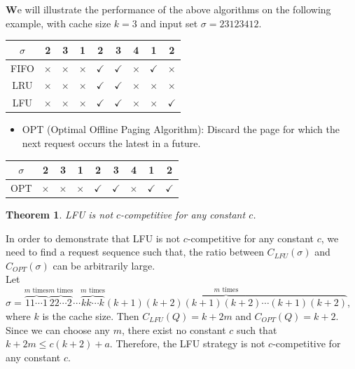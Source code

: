 \documentclass{article}
\newtheorem{theorem}{Theorem}
\newenvironment{proof}[1][Proof]{\begin{trivlist}
\item[\hskip \labelsep {\bfseries #1}]}{\end{trivlist}}
\begin{document}
\textbf We will illustrate the performance of the above algorithms on the following example, 
with cache size $k = 3$ and input set $\sigma = 23123412$.
\begin{center}
 \begin{tabular} {|c|c|c|c|c|c|c|c|c|}
\hline
$\sigma$ & 2  & 3 & 1 & 2 & 3 & 4 & 1 & 2 \\
\hline
 FIFO & $\times$ & $\times$ & $\times$ & $\checkmark$ & $\checkmark$ & $\times$ & $\checkmark$ & $\times$ \\
\hline
 LRU & $\times$ & $\times$  & $\times$  & $\checkmark$ & $\checkmark$ & $\times$ & $\times$ & $\times$ \\
\hline
 LFU & $\times$  & $\times$  & $\times$  & $\checkmark$ & $\checkmark$ & $\times$ & $\times$ & $\checkmark$ \\
\hline
\end{tabular}
\end{center}

\begin{itemize}
\item OPT (Optimal Offline Paging Algorithm): Discard the page for which the next
request occurs the latest in a future.
\end{itemize}
\begin{center}
 \begin{tabular} {|c|c|c|c|c|c|c|c|c|}
\hline
$\sigma$  & 2  & 3 & 1 & 2 & 3 & 4 & 1 & 2 \\
\hline
 OPT & $\times$ & $\times$ & $\times$ & $\checkmark$ & $\checkmark$ & $\times$ & $\checkmark$ & $\checkmark$ \\
\hline
\end{tabular}
\end{center}


\begin{theorem}
LFU is not $c$-competitive for any constant $c$.
\end{theorem}
\begin{proof}
In order to demonstrate that LFU is not $c$-competitive for any constant $c$, 
we need to find a request sequence such that, the ratio between $C_{LFU}(\sigma)$ and $C_{OPT}(\sigma)$ 
can be arbitrarily large.\\
Let $\sigma=\overbrace{1 1\cdots 1}^{m \text{ times}}\overbrace{2 2\cdots 2}^{m \text{ times}} \cdots 
\overbrace{k k\cdots k}^{m \text{ times}} \overbrace{(k+1)(k+2) (k+1)(k+2)\cdots (k+1)(k+2)}^{m \text{ times}}$, 
where $k$ is the cache size. 
Then $C_{LFU}(Q) = k + 2m$ and $C_{OPT}(Q) = k + 2$. 
Since we can choose any $m$, 
there exist no constant $c$ such that $k + 2m \leq c(k + 2) + a$. 
Therefore, the LFU strategy is not $c$-competitive for any constant $c$.
\end{proof}
\end{document}
